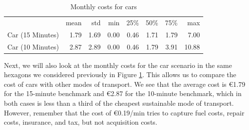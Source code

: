 \begin{table}
  \caption{Monthly costs for cars}
  \label{tab:monthly_costs_for_cars}
  \begin{center}
    \begin{tabular}{lrrrrrrr}
     & mean & std & min & 25\% & 50\% & 75\% & max \\
    Car (15 Minutes) & 1.79 & 1.69 & 0.00 & 0.46 & 1.71 & 1.79 & 7.00 \\
    Car (10 Minutes) & 2.87 & 2.89 & 0.00 & 0.46 & 1.79 & 3.91 & 10.88 \\
    \end{tabular}
  \end{center}
\end{table}

Next, we will also look at the monthly costs for the car scenario in the same hexagons we considered previously in Figure \ref{tab:monthly_costs_for_cars}.
This allows us to compare the cost of cars with other modes of transport.
We see that the average cost is \euro{1.79} for the 15-minute benchmark and \euro{2.87} for the 10-minute benchmark, which in both cases is less than a third of the cheapest sustainable mode of transport.
However, remember that the cost of \euro{0.19}/min tries to capture fuel costs, repair costs, insurance, and tax, but not acquisition costs.
